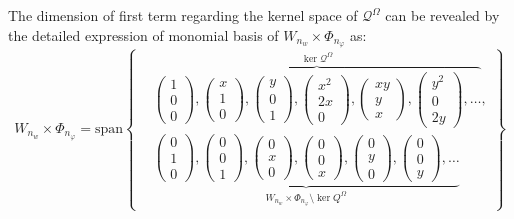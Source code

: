 The dimension of first term regarding the kernel space of $\mathcal Q^\Omega$ can be revealed by the detailed expression of monomial basis of $W_{n_w}\times \Phi_{n_\varphi}$ as:
\begin{equation}
W_{n_w}\times \Phi_{n_\varphi} = \mathrm{span} \left \{\begin{split}
&\overbrace{
\begin{pmatrix}
1 \\ 0 \\ 0
\end{pmatrix},
\begin{pmatrix}
x \\ 1 \\ 0
\end{pmatrix},
\begin{pmatrix}
y \\ 0 \\ 1
\end{pmatrix},
\begin{pmatrix}
x^2 \\ 2x \\ 0
\end{pmatrix},
\begin{pmatrix}
xy \\ y \\ x
\end{pmatrix},
\begin{pmatrix}
y^2 \\ 0 \\ 2y
\end{pmatrix},
\dots}^{\ker \mathcal Q^\Omega}, \\
&\underbrace{
\begin{pmatrix}
0 \\ 1 \\ 0
\end{pmatrix},
\begin{pmatrix}
0 \\ 0 \\ 1
\end{pmatrix},
\begin{pmatrix}
0 \\ x \\ 0
\end{pmatrix},
\begin{pmatrix}
0 \\ 0 \\ x
\end{pmatrix},
\begin{pmatrix}
0 \\ y \\ 0
\end{pmatrix},
\begin{pmatrix}
0 \\ 0 \\ y
\end{pmatrix},
\dots}_{W_{n_w}\times\Phi_{n_\varphi}\setminus \ker Q^\Omega}
\end{split}\right \}
\end{equation}
